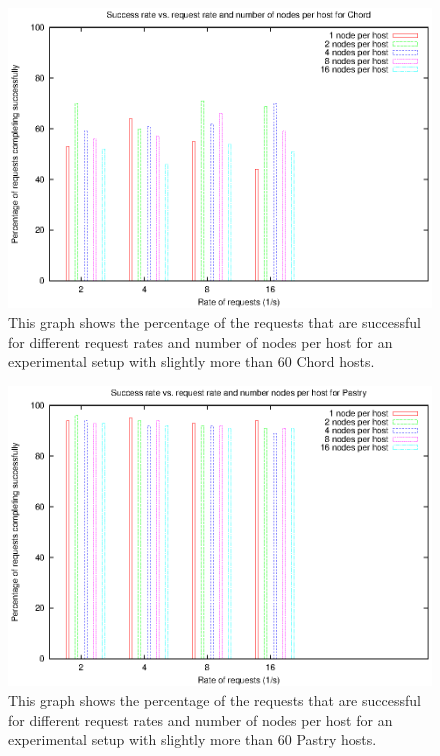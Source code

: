 \begin{figure}[!htbp]
  \begin{center}
    \includegraphics[width=0.9\linewidth]{illustrations/success_rate_chord.eps}
    \caption{This graph shows the percentage of the requests that are successful for different request rates and number of nodes per host for an experimental setup with slightly more than 60 Chord hosts.}
    \label{figChordSuccessRate}
  \end{center}
\end{figure}

\begin{figure}[!htbp]
  \begin{center}
    \includegraphics[width=0.9\linewidth]{illustrations/success_rate_pastry.eps}
    \caption{This graph shows the percentage of the requests that are successful for different request rates and number of nodes per host for an experimental setup with slightly more than 60 Pastry hosts.}
    \label{figPastrySuccessRate}
  \end{center}
\end{figure}


